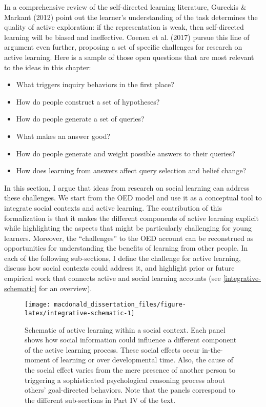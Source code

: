 \documentclass[oneside]{report}
\begin{document}
In a comprehensive review of the self-directed learning literature,
Gureckis \& Markant (2012) point out the learner's understanding of the
task determines the quality of active exploration: if the representation
is weak, then self-directed learning will be biased and ineffective.
Coenen et al. (2017) pursue this line of argument even further,
proposing a set of specific challenges for research on active learning.
Here is a sample of those open questions that are most relevant to the
ideas in this chapter:
\begin{itemize}
\tightlist
\item
  What triggers inquiry behaviors in the first place?
\item
  How do people construct a set of hypotheses?
\item
  How do people generate a set of queries?
\item
  What makes an answer good?
\item
  How do people generate and weight possible answers to their queries?
\item
  How does learning from answers affect query selection and belief
  change?
\end{itemize}
\noindent
In this section, I argue that ideas from research on social learning can
address these challenges. We start from the OED model and use it as a
conceptual tool to integrate social contexts and active learning. The
contribution of this formalization is that it makes the different
components of active learning explicit while highlighting the aspects
that might be particularly challenging for young learners. Moreover, the
``challenges'' to the OED account can be reconstrued as opportunities
for understanding the benefits of learning from other people. In each of
the following sub-sections, I define the challenge for active learning,
discuss how social contexts could address it, and highlight prior or
future empirical work that connects active and social learning accounts
(see \ref{integrative-schematic} for an overview).
\begin{figure}[!t]

{\centering \texttt{[image: macdonald\_dissertation\_files/figure-latex/integrative-schematic-1]} 

}

\caption[Schematic of the integrative account of active learning within a social context.]{Schematic of active learning within a social context. Each panel shows how social information could influence a different component of the active learning process. These social effects occur in-the-moment of learning or over developmental time. Also, the cause of the social effect varies from the mere presence of another person to triggering a sophisticated psychological reasoning process about others' goal-directed behaviors. Note that the panels correspond to the different sub-sections in Part IV of the text.}\label{fig:integrative-schematic}
\end{figure}
\end{document}
